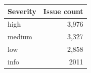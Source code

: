 \begin{tabular}{@{}lr@{}}
\toprule
Severity & Issue count \\
\midrule
high & 3,976 \\
medium & 3,327 \\
low & 2,858 \\
info & 2011 \\
\bottomrule
\end{tabular}

